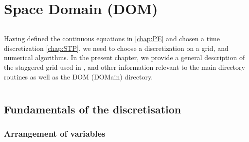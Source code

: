 \documentclass[../tex_main/NEMO_manual]{subfiles}
\begin{document}
\chapter{Space Domain (DOM)}
\label{chap:DOM}
\minitoc



\newpage
$\ $\newline    %

Having defined the continuous equations in \autoref{chap:PE} and chosen a time 
discretization \autoref{chap:STP}, we need to choose a discretization on a grid, 
and numerical algorithms. In the present chapter, we provide a general description 
of the staggered grid used in \NEMO, and other information relevant to the main 
directory routines as well as the DOM (DOMain) directory. 

$\ $\newline    %

\section{Fundamentals of the discretisation}
\label{sec:DOM_basics}

\subsection{Arrangement of variables}
\label{subsec:DOM_cell}
\end{document}
